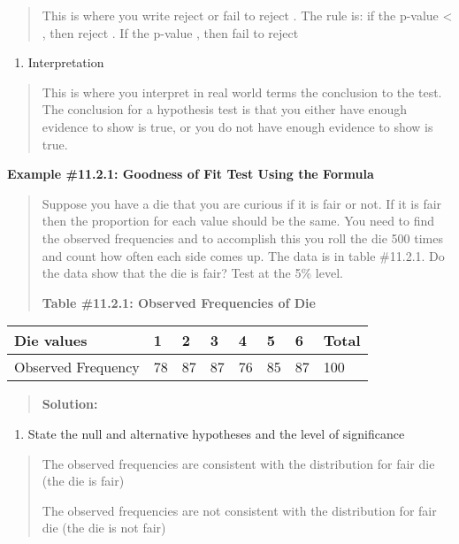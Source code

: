 \documentclass[]{book}
\providecommand{\tightlist}{%
  \setlength{\itemsep}{0pt}\setlength{\parskip}{0pt}}
\begin{document}
\begin{quote}
This is where you write reject or fail to reject . The rule is: if the p-value \textless{} , then reject . If the p-value , then fail to reject
\end{quote}

\begin{enumerate}
\def\labelenumi{\arabic{enumi}.}
\setcounter{enumi}{4}
\tightlist
\item
  Interpretation
\end{enumerate}

\begin{quote}
This is where you interpret in real world terms the conclusion to the test. The conclusion for a hypothesis test is that you either have enough evidence to show is true, or you do not have enough evidence to show is true.
\end{quote}

\textbf{Example \#11.2.1: Goodness of Fit Test Using the Formula}

\begin{quote}
Suppose you have a die that you are curious if it is fair or not. If it is fair then the proportion for each value should be the same. You need to find the observed frequencies and to accomplish this you roll the die 500 times and count how often each side comes up. The data is in table \#11.2.1. Do the data show that the die is fair? Test at the 5\% level.

\textbf{Table \#11.2.1: Observed Frequencies of Die}
\end{quote}

\begin{longtable}[]{@{}llllllll@{}}
\toprule
Die values & 1 & 2 & 3 & 4 & 5 & 6 & Total\tabularnewline
\midrule
\endhead
Observed Frequency & 78 & 87 & 87 & 76 & 85 & 87 & 100\tabularnewline
\bottomrule
\end{longtable}

\begin{quote}
\textbf{Solution:}
\end{quote}

\begin{enumerate}
\def\labelenumi{\arabic{enumi}.}
\tightlist
\item
  State the null and alternative hypotheses and the level of significance
\end{enumerate}

\begin{quote}
The observed frequencies are consistent with the distribution for fair die (the die is fair)

The observed frequencies are not consistent with the distribution for fair die (the die is not fair)
\end{quote}
\end{document}
